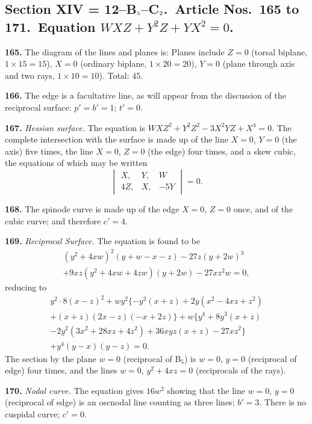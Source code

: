 \documentclass[11pt,a4paper]{article}
\theoremstyle{definition}
\begin{document}
\subsection*{Section XIV = 12--B$_{\mbox{\scriptsize 5}}$--C$_{\mbox{\scriptsize 2}}$.\ Article Nos.\ 165 to 171.\ Equation $WXZ+Y^2Z+YX^2=0$.}

\noindent\textbf{165.} The diagram of the lines and planes is: Planes include $Z=0$ (torsal biplane, $1\times 15=15$), $X=0$ (ordinary biplane, $1\times 20=20$), $Y=0$ (plane through axis and two rays, $1\times 10=10$). Total: 45.

\noindent\textbf{166.} The edge is a facultative line, as will appear from the discussion of the reciprocal surface: $p'=b'=1$; $t'=0$.

\noindent\textbf{167.} \textit{Hessian surface.} The equation is $WXZ^2+Y^2Z^2-3X^2YZ+X^4=0$. The complete intersection with the surface is made up of the line $X=0$, $Y=0$ (the axis) five times, the line $X=0$, $Z=0$ (the edge) four times, and a skew cubic, the equations of which may be written
\[
\begin{vmatrix}
X, & Y, & W \\
4Z, & X, & -5Y
\end{vmatrix}=0.
\]

\setcounter{page}{438}

\noindent\textbf{168.} The spinode curve is made up of the edge $X=0$, $Z=0$ once, and of the cubic curve; and therefore $c'=4$.

\noindent\textbf{169.} \textit{Reciprocal Surface.} The equation is found to be
\begin{multline*}
(y^2+4xw)^2(y+w-x-z) - 27z(y+2w)^3 \\
+ 9xz(y^2+4xw+4zw)(y+2w) - 27xz^2w = 0,
\end{multline*}
reducing to
\begin{multline*}
y^2\cdot 8(x-z)^2 + wy^2\{-y^2(x+z)+2y(x^2-4xz+z^2)\\
+(x+z)(2x-z)(-x+2z)\} + w\{y^4+8y^3(x+z)\\
-2y^2(3x^2+28xz+4z^2)+36xyz(x+z)-27xz^2\}\\
+y^4(y-x)(y-z)=0.
\end{multline*}
The section by the plane $w=0$ (reciprocal of B$_5$) is $w=0$, $y=0$ (reciprocal of edge) four times, and the lines $w=0$, $y^2+4xz=0$ (reciprocals of the rays).

\setcounter{page}{439}

\noindent\textbf{170.} \textit{Nodal curve.} The equation gives $16w^2$ showing that the line $w=0$, $y=0$ (reciprocal of edge) is an oscnodal line counting as three lines; $b'=3$. There is no cuspidal curve; $c'=0$.
\end{document}
